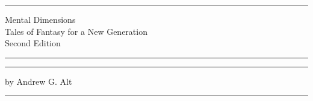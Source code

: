 \thispagestyle{empty}
\begin{center}
	\noindent\rule{\textwidth}{2pt}

	\vspace{10pt}
	{\Huge Mental Dimensions} \\

	\vspace{.5em}
	{\large Tales of Fantasy for a New Generation} \\

	\vspace{.5em}
	{\normalsize Second Edition}
	\noindent\rule{\textwidth}{2pt}

	\vspace{5in}
	\rule{\textwidth}{2pt}

	\vspace{.5em}
	{\large by Andrew G. Alt}

	\rule{\textwidth}{2pt}
\end{center}
